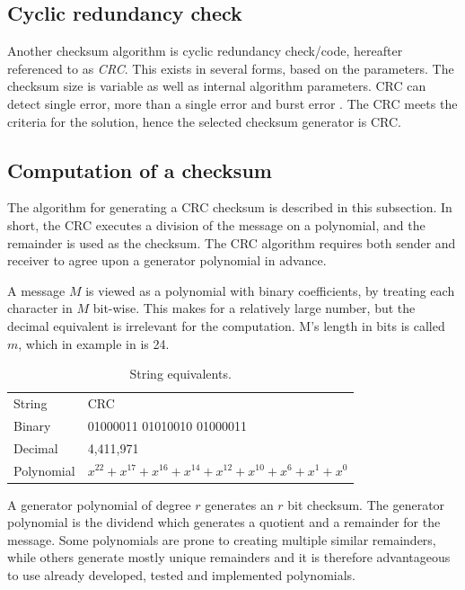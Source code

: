 \subsection*{Cyclic redundancy check}
Another checksum algorithm is cyclic redundancy check/code, hereafter referenced to as \textit{CRC}. This exists in several forms, based on the parameters. The checksum size is variable as well as internal algorithm parameters.  CRC can detect single error, more than a single error and burst error \cite[p.~31]{elahi2001network}. The CRC meets the criteria for the solution, hence the selected checksum generator is CRC.

\subsection{Computation of a checksum}
The algorithm for generating a CRC checksum is described in this subsection.
In short, the CRC executes a division of the message on a polynomial, and the remainder is used as the checksum. 
The CRC algorithm requires both sender and receiver to agree upon a generator polynomial in advance.

A message $M$ is viewed as a polynomial with binary coefficients, by treating each character in $M$ bit-wise. This makes for a relatively large number, but the decimal equivalent is irrelevant for the computation. M's length in bits is called $m$, which in example in  is 24.

\begin{table}[h!]
	\centering
	\begin{tabular}{ll}
		String  & CRC                        \\
		Binary  & 01000011 01010010 01000011 \\
		Decimal & 4,411,971                  \\
		Polynomial & $x^{22} + x^{17} + x^{16} + x^{14} + x^{12} + x^{10} + x^{6} + x^{1} + x^{0}$
	\end{tabular}
	\caption{String equivalents.}
	\label{tab:string}
\end{table}

A generator polynomial of degree $r$ generates an $r$ bit checksum. The generator polynomial is the dividend which generates a quotient and a remainder for the message. Some polynomials are prone to creating multiple similar remainders, while others generate mostly unique remainders and it is therefore advantageous to use already developed, tested and implemented polynomials.

